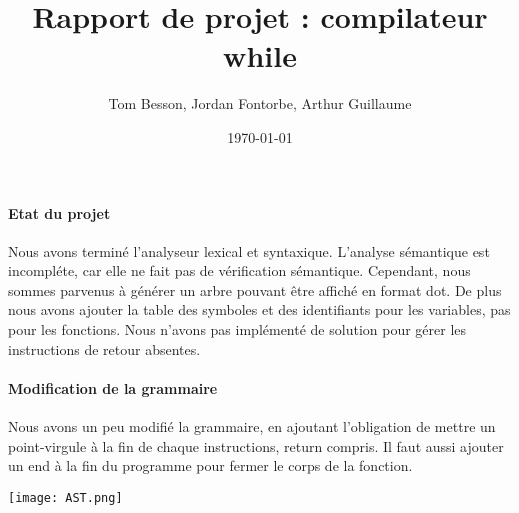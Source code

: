 \documentclass{report}
\title{Rapport de projet : compilateur while}
\author{Tom Besson, Jordan Fontorbe, Arthur Guillaume}
\date{\today}
\begin{document}
\maketitle

\paragraph{Etat du projet} Nous avons terminé l'analyseur lexical et syntaxique. L'analyse sémantique est incompléte, car elle ne fait pas de vérification 
sémantique. Cependant, nous sommes parvenus à générer un arbre pouvant être affiché en format dot. De plus nous avons ajouter la table des symboles et des 
identifiants pour les variables, pas pour les fonctions. Nous n'avons pas implémenté de solution pour gérer les instructions de retour absentes.

\paragraph{Modification de la grammaire} Nous avons un peu modifié la grammaire, en ajoutant l'obligation de mettre un point-virgule à la fin de chaque 
instructions, return compris. Il faut aussi ajouter un end à la fin du programme pour fermer le corps de la fonction. 
\newline
\begin{center}\texttt{[image: AST.png]}\end{center}
\end{document}

